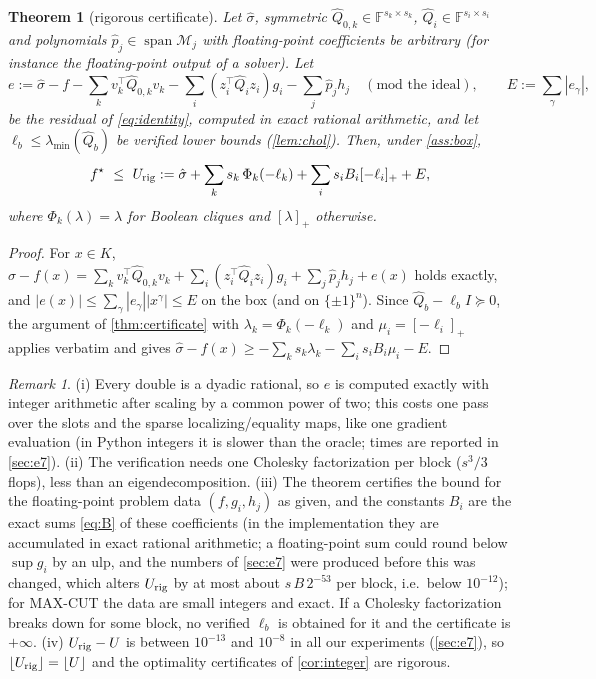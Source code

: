 \documentclass[a4paper,11pt]{article}
\theoremstyle{plain}
\newtheorem{theorem}{Theorem}
\theoremstyle{definition}
\theoremstyle{remark}
\newtheorem{remark}{Remark}
\newcommand{\lmin}{\lambda_{\min}}
\newcommand{\pos}[1]{[#1]_+}
\begin{document}
\begin{theorem}[rigorous certificate]\label{thm:rigor}
Let $\hat\sigma$, symmetric $\hat Q_{0,k}\in\mathbb F^{s_k\times s_k}$, $\hat Q_i\in\mathbb F^{s_i\times s_i}$ and polynomials $\hat p_j\in\operatorname{span}\mathcal M_j$ with floating-point coefficients be \emph{arbitrary} (for instance the floating-point output of a solver). Let
\[
e:=\hat\sigma-f-\sum_kv_k^\top\hat Q_{0,k}v_k-\sum_i(z_i^\top\hat Q_iz_i)g_i-\sum_j\hat p_jh_j\quad(\text{mod the ideal}),\qquad E:=\sum_\gamma|e_\gamma|,
\]
be the residual of \eqref{eq:identity}, computed in exact rational arithmetic, and let $\ell_b\le\lmin(\hat Q_b)$ be verified lower bounds (\cref{lem:chol}). Then, under \cref{ass:box},
\[
f^\star\ \le\ U_{\rm rig}:=\hat\sigma+\sum_ks_k\,\Phi_k(-\ell_k)+\sum_is_iB_i\pos{-\ell_i}+E,
\]
where $\Phi_k(\lambda)=\lambda$ for Boolean cliques and $\pos{\lambda}$ otherwise.
\end{theorem}
\begin{proof}
For $x\in K$, $\hat\sigma-f(x)=\sum_kv_k^\top\hat Q_{0,k}v_k+\sum_i(z_i^\top\hat Q_iz_i)g_i+\sum_j\hat p_jh_j+e(x)$ holds exactly, and $|e(x)|\le\sum_\gamma|e_\gamma||x^\gamma|\le E$ on the box (and on $\{\pm1\}^n$). Since $\hat Q_b-\ell_bI\succeq0$, the argument of \cref{thm:certificate} with $\lambda_k=\Phi_k(-\ell_k)$ and $\mu_i=\pos{-\ell_i}$ applies verbatim and gives $\hat\sigma-f(x)\ge-\sum_ks_k\lambda_k-\sum_is_iB_i\mu_i-E$.
\end{proof}
\begin{remark}
(i) Every double is a dyadic rational, so $e$ is computed exactly with integer arithmetic after scaling by a common power of two; this costs one pass over the slots and the sparse localizing/equality maps, like one gradient evaluation (in Python integers it is slower than the oracle; times are reported in \cref{sec:e7}). (ii) The verification needs one Cholesky factorization per block ($s^3/3$ flops), less than an eigendecomposition. (iii) The theorem certifies the bound for the floating-point problem data $(f,g_i,h_j)$ as given, and the constants $B_i$ are the exact sums \eqref{eq:B} of these coefficients (in the implementation they are accumulated in exact rational arithmetic; a floating-point sum could round below $\sup g_i$ by an ulp, and the numbers of \cref{sec:e7} were produced before this was changed, which alters $U_{\rm rig}$ by at most about $s\,B\,2^{-53}$ per block, i.e.\ below $10^{-12}$); for MAX-CUT the data are small integers and exact. If a Cholesky factorization breaks down for some block, no verified $\ell_b$ is obtained for it and the certificate is $+\infty$. (iv) $U_{\rm rig}-U$ is between $10^{-13}$ and $10^{-8}$ in all our experiments (\cref{sec:e7}), so $\lfloor U_{\rm rig}\rfloor=\lfloor U\rfloor$ and the optimality certificates of \cref{cor:integer} are rigorous.
\end{remark}
\end{document}
